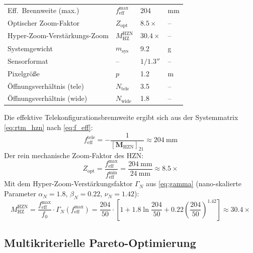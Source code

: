 ﻿\documentclass[12pt,a4paper]{article}
\theoremstyle{definition}
\newcommand{\HZ}{\mathrm{HZ}}
\newcommand{\eff}{\mathrm{eff}}
\begin{document}
\begin{table}[H]
\begin{tabular}{llll}
			\rowcolor{blue!8}
			Eff.\ Brennweite (max.)       & $f_\eff^\mathrm{max}$ & 204& mm \\
			Optischer Zoom-Faktor         & $Z_\mathrm{opt}$ & $8.5\times$ & -- \\
			\rowcolor{blue!8}
			Hyper-Zoom-Verstärkungs-Zoom   & $M_\HZ^\mathrm{HZN}$& $30.4\times$ & -- \\
			Systemgewicht                 & $m_\mathrm{sys}$ & 9.2    & g \\
			\rowcolor{blue!8}
			Sensorformat                  & --               & $1/1.3''$& -- \\
			Pixelgr\"o{\ss}e             & $p$              & 1.2    & \textmu m \\
			\rowcolor{blue!8}
			\"Offnungsverh\"altnis (tele) & $N_\mathrm{tele}$& 3.5    & -- \\
			\"Offnungsverh\"altnis (wide) & $N_\mathrm{wide}$& 1.8    & -- \\
			\bottomrule
		\end{tabular}
	\end{table}

	Die effektive Telekonfigurationsbrennweite ergibt sich aus der Systemmatrix
	\eqref{eq:rtm_hzn} nach \eqref{eq:f_eff}:
	\begin{equation}
		f_\eff^\mathrm{tele}
		= -\frac{1}{[\mathbf{M}_\mathrm{HZN}]_{21}}
		\approx \SI{204}{\milli\metre}
		\label{eq:feff_hzn_tele}
	\end{equation}
	Der rein mechanische Zoom-Faktor des HZN:
	\begin{equation}
		Z_\mathrm{opt}
		= \frac{f_\eff^\mathrm{max}}{f_\eff^\mathrm{min}}
		= \frac{\SI{204}{\milli\metre}}{\SI{24}{\milli\metre}}
		\approx 8.5\times
		\label{eq:zoom_ratio_hzn}
	\end{equation}
	Mit dem Hyper-Zoom-Verst\"arkungsfaktor $\Gamma_N$ aus \eqref{eq:gamma}
	(nano-skalierte Parameter $\alpha_N = 1.8$, $\beta_N = 0.22$,
	$\nu_N = 1.42$):
	\begin{equation}
		\boxed{
			M_\HZ^\mathrm{HZN}
			= \frac{f_\eff^\mathrm{max}}{f_0}\cdot
			\Gamma_N\!\left(f_\eff^\mathrm{max}\right)
			= \frac{204}{50}\cdot\!\left[1
			+ 1.8\ln\!\frac{204}{50}
			+ 0.22\!\left(\frac{204}{50}\right)^{\!1.42}\right]
			\approx 30.4\times
		}
		\label{eq:Mhz_hzn}
	\end{equation}

	\subsection{Multikriterielle Pareto-Optimierung}
\end{document}
